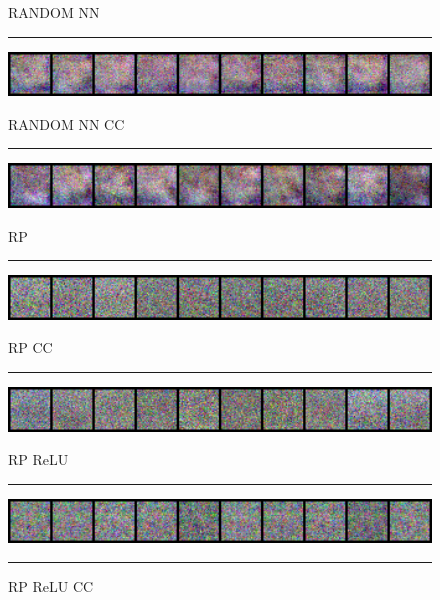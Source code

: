 \begin{figure}[h]
    \centering
    \setlength{\abovecaptionskip}{0pt plus 0pt minus 0pt}
    \setlength{\belowcaptionskip}{10pt plus 0pt minus 0pt}
    \caption*{\normalsize{RANDOM NN}}
    \rule{0.4\textwidth}{.4pt}
    
    \centerline{\hspace*{8mm}\includegraphics[width=1.4\textwidth]{figures/inversion_CIFAR10_RANDOM_NN_epoch_3000.png}}
    \caption*{\normalsize{RANDOM NN CC}}
    \rule{0.4\textwidth}{.4pt}
    
    \centerline{\hspace*{8mm}\includegraphics[width=1.4\textwidth]{figures/inversion_CIFAR10_RANDOM_NN_CC_epoch_3000.png}}
    \caption*{\normalsize{RP}}
    \rule{0.4\textwidth}{.4pt}
    
    \centerline{\hspace*{8mm}\includegraphics[width=1.4\textwidth]{figures/inversion_CIFAR10_RP_epoch_3000.png}}
    \caption*{\normalsize{RP CC}}
    \rule{0.4\textwidth}{.4pt}
    
    \centerline{\hspace*{8mm}\includegraphics[width=1.4\textwidth]{figures/inversion_CIFAR10_RP_CC_epoch_3000.png}}
    \caption*{\normalsize{RP ReLU}}
    \rule{0.4\textwidth}{.4pt}
    
    \centerline{\hspace*{8mm}\includegraphics[width=1.4\textwidth]{figures/inversion_CIFAR10_RP_ReLU_epoch_3000.png}}
    \caption*{\normalsize{RP ReLU CC}}
    \rule{0.4\textwidth}{.4pt}
    

\end{figure}
